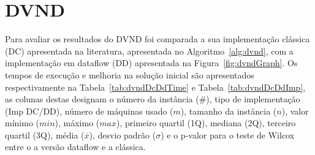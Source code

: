 \section{DVND} \label{sec:resultadosDVND}

Para avaliar os resultados do DVND foi comparada a sua implementação clássica (DC) apresentada na literatura, apresentada no Algoritmo~\ref{alg:dvnd}, com a implementação em dataflow (DD) apresentada na Figura~\ref{fig:dvndGraph}.
Os tempos de execução e melhoria na solução inicial são apresentados respectivamente na Tabela~\ref{tab:dvndDcDdTime} e Tabela~\ref{tab:dvndDcDdImp}, as colunas destas designam o número da instância (\#), tipo de implementação (Imp DC/DD), número de máquinas usado ($m$), tamanho da instância ($n$), valor mínimo ($min$), máximo ($max$), primeiro quartil (1Q), mediana (2Q), terceiro quartil (3Q), média ($\overline{x}$), desvio padrão ($\sigma$) e o p-valor para o teste de Wilcox entre o a versão dataflow e a clássica.




